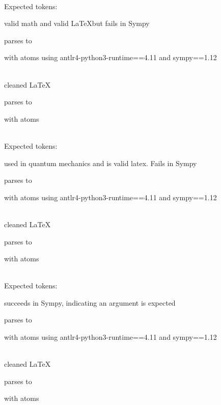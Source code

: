 \documentclass{article}
\begin{document}
\ \\
Expected tokens:


\hrulefill

valid math and valid \LaTeX but fails in Sympy

parses to

with atoms
using antlr4-python3-runtime==4.11 and sympy==1.12

\ \\
cleaned \LaTeX

parses to

with atoms


\ \\
Expected tokens:


\hrulefill

used in quantum mechanics and is valid latex. Fails in Sympy

parses to

with atoms
using antlr4-python3-runtime==4.11 and sympy==1.12

\ \\
cleaned \LaTeX

parses to

with atoms


\ \\
Expected tokens:


\hrulefill

succeeds in Sympy, indicating an argument is expected

parses to

with atoms
using antlr4-python3-runtime==4.11 and sympy==1.12

\ \\
cleaned \LaTeX

parses to

with atoms

\end{document}
